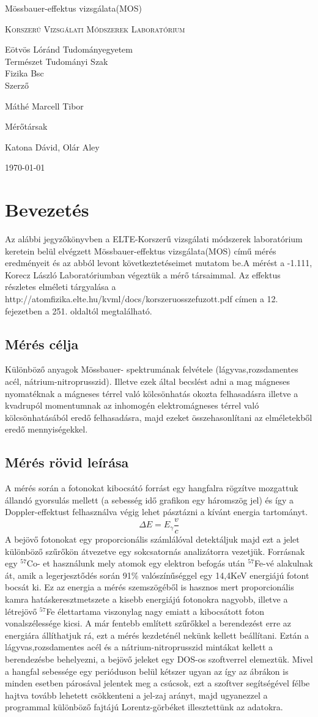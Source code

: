 \documentclass[a4paper,12pt]{article}
\numberwithin{equation}{subsection}
\newcommand*{\myTitle}{\begingroup 
\centering 
\vspace*{\baselineskip} 
{\LARGE Mössbauer-effektus vizsgálata(MOS)}%
\vspace*{1\baselineskip}

\scshape %
Korszerű Vizsgálati Módszerek Laboratórium

\vspace*{1\baselineskip}
Eötvös Lóránd Tudományegyetem\\[\baselineskip]
Természet Tudományi Szak\\[\baselineskip]
Fizika Bsc\\[\baselineskip]
\vspace*{5\baselineskip} 
Szerző\\[\baselineskip]
{\Large Máthé Marcell Tibor\par} 
\vspace*{3\baselineskip}
Mérőtársak \\
{ Katona Dávid, Olár Aley \par} 

\vspace*{1\baselineskip}
\today

\endgroup\clearpage}
\begin{document}
\thispagestyle{empty} 
\myTitle
\newpage
\thispagestyle{empty}
\tableofcontents
\newpage
\section{Bevezetés}
Az alábbi jegyzőkönyvben a ELTE-Korszerű vizsgálati módszerek laboratórium keretein belül elvégzett Mössbauer-effektus vizsgálata(MOS) című mérés eredményeit és az abból levont következtetéseimet mutatom be.A mérést a -1.111, Korecz László Laboratóriumban végeztük a mérő társaimmal. Az effektus részletes elméleti tárgyalása a \\ http://atomfizika.elte.hu/kvml/docs/korszeruosszefuzott.pdf címen a 12. fejezetben a 251. oldaltól megtalálható. 
\subsection{Mérés célja}
Különböző anyagok Mössbauer- spektrumának felvétele (lágyvas,rozsdamentes acél, nátrium-nitroprusszid). Illetve ezek által becslést adni a mag mágneses nyomatéknak a mágneses térrel való kölcsönhatás okozta felhasadásra illetve a kvadrupól momentumnak az inhomogén elektromágneses térrel való kölcsönhatásából eredő felhasadásra, majd ezeket összehasonlítani az elméletekből eredő mennyiségekkel.
\subsection{Mérés rövid leírása}
A mérés során a fotonokat kibocsátó forrást egy hangfalra rögzítve mozgattuk állandó gyorsulás mellett (a sebesség idő grafikon egy háromszög jel) és így a Doppler-effektust felhasználva végig lehet pásztázni a kívánt energia tartományt. \[\Delta E=E_{\gamma}\frac{v}{c}\]  A bejövő fotonokat egy proporcionális számlálóval detektáljuk majd ezt a jelet különböző szűrőkön átvezetve egy sokcsatornás analizátorra vezetjük. Forrásnak egy $^{57}$Co- et használunk mely atomok egy elektron befogás után $^{57}$Fe-vé alakulnak át, amik a legerjesztődés során 91\% valószínűséggel egy 14,4KeV energiájú fotont bocsát ki. Ez az energia a mérés szemszögéből is hasznos mert proporcionális kamra hatáskeresztmetszete a kisebb energiájú fotonokra nagyobb, illetve a létrejövő $^{57}$Fe élettartama viszonylag nagy emiatt a kibocsátott foton vonalszélessége kicsi. A már fentebb említett szűrőkkel a berendezést erre az energiára állíthatjuk rá, ezt a mérés kezdeténél nekünk kellett beállítani. Eztán a lágyvas,rozsdamentes acél és a nátrium-nitroprusszid mintákat kellett a berendezésbe behelyezni, a bejövő jeleket egy DOS-os szoftverrel elemeztük. Mivel a hangfal sebessége egy perióduson belül kétszer ugyan az így az ábrákon is minden esetben párosával jelentek meg a csúcsok, ezt a szoftver segítségével félbe hajtva tovább lehetett csökkenteni a jel-zaj arányt, majd ugyanezzel a programmal különböző fajtájú Lorentz-görbéket illesztettünk az adatokra.
\newpage
\end{document}
